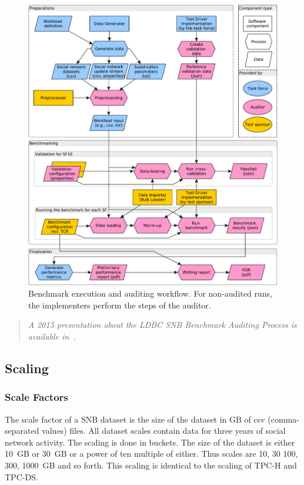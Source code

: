 \begin{figure}[h]
    \centering
    \includegraphics[scale=\yedscale]{figures/auditing-workflow}    
    \caption{Benchmark execution and auditing workflow. For non-audited runs, the implementers perform the steps of the auditor.}
    \label{fig:audit-workflow}
\end{figure}

\begin{quote}
    \emph{A 2015 presentation about the LDBC SNB Benchmark Auditing Process is available in~\cite{auditing}.}
\end{quote}

\subsection{Scaling}

\subsubsection{Scale Factors}
The scale factor of a SNB dataset is the size of the dataset in GB of csv (comma-separated values) files. All dataset scales contain data for three years of social network activity. The scaling is done in buckets. The size of the dataset is either 10~GB or 30~GB or a power of ten multiple of either. Thus scales are 10, 30 100, 300, 1000~GB and so forth. This scaling is identical to the scaling of TPC-H and TPC-DS. 

